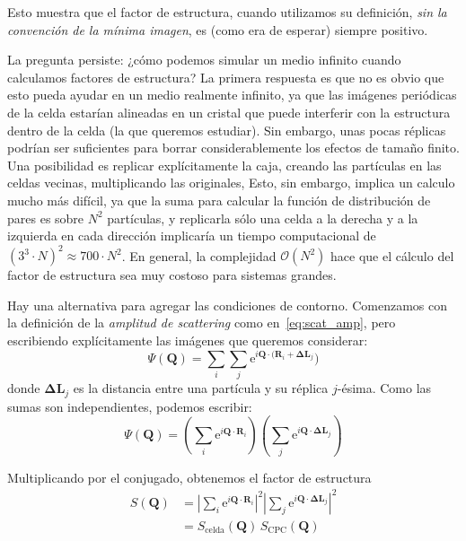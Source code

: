Esto muestra que el factor de estructura, cuando utilizamos su definición, \emph{sin la convención de la mínima imagen}, es (como era de esperar) siempre positivo.

La pregunta persiste: ¿cómo podemos simular un medio infinito cuando calculamos factores de estructura?
La primera respuesta es que no es obvio que esto pueda ayudar en un medio realmente infinito, ya que las imágenes periódicas de la celda estarían alineadas en un cristal que puede interferir con la estructura dentro de la celda (la que queremos estudiar).
Sin embargo, unas pocas réplicas podrían ser suficientes para borrar considerablemente los efectos de tamaño finito.
Una posibilidad es replicar explícitamente la caja, creando las partículas en las celdas vecinas, multiplicando las originales,
Esto, sin embargo, implica un calculo mucho más difícil, ya que la suma para calcular la función de distribución de pares es sobre $N^2$ partículas, y replicarla sólo una celda a la derecha y a la izquierda en cada dirección implicaría un tiempo computacional de  $(3^3\cdot N)^2 \approx 700\cdot N^2$.
En general, la complejidad $\mathcal{O}(N^2)$ hace que el cálculo del factor de estructura sea muy costoso para sistemas grandes.

Hay una alternativa para agregar las condiciones de contorno.
Comenzamos con la definición de la \emph{amplitud de scattering} como en~\ref{eq:scat_amp}, pero escribiendo explícitamente las imágenes que queremos considerar:
\begin{equation}
  \Psi(\mathbf{Q}) = \sum_i \sum_j
  \text{e}^{i\mathbf{Q}\cdot(\mathbf{R}_i+\mathbf{\Delta L}_j})
\end{equation}
donde $\mathbf{\Delta L}_j$ es la distancia entre una partícula y su réplica
$j$-ésima. Como las sumas son independientes, podemos escribir:
\begin{equation}
  \Psi(\mathbf{Q}) = \left(\sum_i
    \text{e}^{i\mathbf{Q}\cdot\mathbf{R}_i}\right)
  \left(\sum_j\text{e}^{i\mathbf{Q}\cdot\mathbf{\Delta L}_j}\right)
\end{equation}

Multiplicando por el conjugado, obtenemos el factor de estructura
\begin{align}
  S(\mathbf{Q}) &= \left|\sum_i
    \text{e}^{i\mathbf{Q}\cdot\mathbf{R}_i}\right|^2 \left|\sum_j
    \text{e}^{i\mathbf{Q}\cdot\mathbf{\Delta L}_j}\right|^2\\
  &= S_{\text{celda}}(\mathbf{Q})\,S_{\text{CPC}}(\mathbf{Q})
\end{align}

